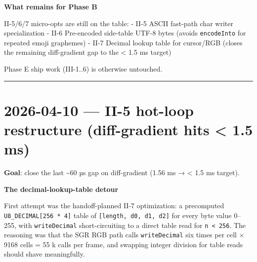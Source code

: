 \textbf{What remains for Phase B}

II-5/6/7 micro-opts are still on the table: - II-5 ASCII fast-path char writer specialization - II-6 Pre-encoded side-table UTF-8 bytes (avoids \texttt{e\allowbreak{}n\allowbreak{}c\allowbreak{}o\allowbreak{}d\allowbreak{}e\allowbreak{}I\allowbreak{}n\allowbreak{}t\allowbreak{}o} for repeated emoji graphemes) - II-7 Decimal lookup table for cursor/RGB (closes the remaining diff-gradient gap to the \textless{} 1.5 ms target)

Phase E ship work (III-1..6) is otherwise untouched.

\begin{center}\rule{0.5\linewidth}{0.5pt}\end{center}

\section{2026-04-10 --- II-5 hot-loop restructure (diff-gradient hits \textless{} 1.5 ms)}\label{record-422-ii-5-hot-loop-restructure-diff-gradient-hits-1.5-ms}

\textbf{Goal}: close the last \textasciitilde60 µs gap on diff-gradient (1.56 ms → \textless{} 1.5 ms target).

\textbf{The decimal-lookup-table detour}

First attempt was the handoff-planned II-7 optimization: a precomputed \texttt{U\allowbreak{}8\allowbreak{}\_\allowbreak{}D\allowbreak{}E\allowbreak{}C\allowbreak{}I\allowbreak{}M\allowbreak{}A\allowbreak{}L\allowbreak{}[\allowbreak{}2\allowbreak{}5\allowbreak{}6\allowbreak{} \allowbreak{}*\allowbreak{} \allowbreak{}4\allowbreak{}]} table of \texttt{[\allowbreak{}l\allowbreak{}e\allowbreak{}n\allowbreak{}g\allowbreak{}t\allowbreak{}h\allowbreak{},\allowbreak{} \allowbreak{}d\allowbreak{}0\allowbreak{},\allowbreak{} \allowbreak{}d\allowbreak{}1\allowbreak{},\allowbreak{} \allowbreak{}d\allowbreak{}2\allowbreak{}]} for every byte value 0--255, with \texttt{w\allowbreak{}r\allowbreak{}i\allowbreak{}t\allowbreak{}e\allowbreak{}D\allowbreak{}e\allowbreak{}c\allowbreak{}i\allowbreak{}m\allowbreak{}a\allowbreak{}l} short-circuiting to a direct table read for \texttt{n\allowbreak{} \allowbreak{}<\allowbreak{} \allowbreak{}2\allowbreak{}5\allowbreak{}6}. The reasoning was that the SGR RGB path calls \texttt{w\allowbreak{}r\allowbreak{}i\allowbreak{}t\allowbreak{}e\allowbreak{}D\allowbreak{}e\allowbreak{}c\allowbreak{}i\allowbreak{}m\allowbreak{}a\allowbreak{}l} six times per cell × 9168 cells = 55 k calls per frame, and swapping integer division for table reads should shave meaningfully.

